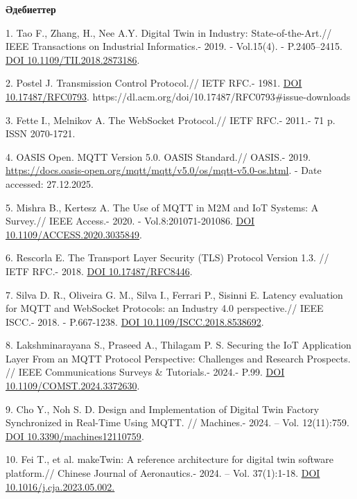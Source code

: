 \begin{center}
{\bfseries Әдебиеттер}
\end{center}

\begin{refs}
1. Tao F., Zhang, H., Nee A.Y. Digital Twin in Industry:
State-of-the-Art.// IEEE Transactions on Industrial Informatics.- 2019.
- Vol.15(4). - P.2405--2415.
\href{https://doi.org/10.1109/TII.2018.2873186}{DOI
10.1109/TII.2018.2873186}.

2. Postel J. Transmission Control Protocol.// IETF RFC.-
1981. \href{https://www.google.com/search?q=https://doi.org/10.17487/RFC0793}{DOI
10.17487/RFC0793}.
https://dl.acm.org/doi/10.17487/RFC0793\#issue-downloads

3. Fette I., Melnikov A. The WebSocket Protocol.// IETF RFC.- 2011.- 71
p. ISSN 2070-1721.

4. OASIS Open. MQTT Version 5.0. OASIS Standard.// OASIS.- 2019.
\url{https://docs.oasis-open.org/mqtt/mqtt/v5.0/os/mqtt-v5.0-os.html}.
- Date accessed: 27.12.2025.

5. Mishra B., Kertesz A. The Use of MQTT in M2M and IoT Systems: A
Survey.// IEEE Access.- 2020. - Vol.8:201071-201086.
\href{https://doi.org/10.1109/ACCESS.2020.3035849}{DOI
10.1109/ACCESS.2020.3035849}.

6. Rescorla E. The Transport Layer Security (TLS) Protocol Version
1.3. // IETF RFC.- 2018. \href{https://doi.org/10.17487/RFC8446}{DOI
10.17487/RFC8446}.

7. Silva D. R., Oliveira G. M., Silva I., Ferrari P., Sisinni E. Latency
evaluation for MQTT and WebSocket Protocols: an Industry 4.0
perspective.// IEEE ISCC.- 2018. - P.667-1238.
\href{https://doi.org/10.1109/ISCC.2018.8538692}{DOI
10.1109/ISCC.2018.8538692}.

8. Lakshminarayana S., Praseed A., Thilagam P. S. Securing the IoT
Application Layer From an MQTT Protocol Perspective: Challenges and
Research Prospects. // IEEE Communications Surveys \& Tutorials.- 2024.-
P.99.
\href{https://www.google.com/search?q=https://doi.org/10.1109/COMST.2024.3372630}{DOI
10.1109/COMST.2024.3372630}.

9. Cho Y., Noh S. D. Design and Implementation of Digital Twin Factory
Synchronized in Real-Time Using MQTT. // Machines.- 2024. -- Vol.
12(11):759. \href{https://doi.org/10.3390/machines12110759}{DOI
10.3390/machines12110759}.

10. Fei T., et al. makeTwin: A reference architecture for digital twin
software platform.// Chinese Journal of Aeronautics.- 2024. -- Vol.
37(1):1-18. \href{https://doi.org/10.1016/j.cja.2023.09.005}{DOI
10.1016/j.cja.2023.05.002\ul{.}}


\end{refs}
